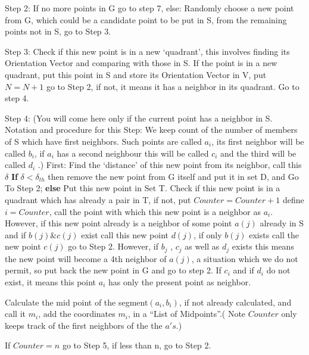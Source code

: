 \documentclass[english]{article}
\begin{document}
Step 2: If no more points in G go to step 7, else: Randomly choose
a new point from G, which could be a candidate point to be put in
S, from the remaining points not in S, go to Step 3.

Step 3: Check if this new point is in a new `quadrant', this involves
finding its Orientation Vector and comparing with those in S. If the
point is in a new quadrant, put this point in S and store its Orientation
Vector in V, put $N=N+1$ go to Step 2, if not, it means it has a
neighbor in its quadrant. Go to step 4.

Step 4: (You will come here only if the current point has a neighbor
in S. Notation and procedure for this Step: We keep count of the number
of members of S which have first neighbors. Such points are called $a_{i}$,
its first neighbor will be called $b_{i}$, if $a_{i}$ has a second
neighbour this will be called $c_{i}$ and the third will be called
$d_{i}$ .) First: Find the `distance' of this new point from its neighbor, call this$\delta$ \textbf{If} $\delta < \delta_{th}$
then remove the new point from G itself and put it in set D, and Go To Step
2; \textbf{else} Put this new point in Set T. Check if this new point is in a quadrant which has already a pair in T, if not, put $Counter=Counter+1$ define $i=Counter$, call the point with which this new point is a neighbor as $a_{i}$. However, if this new point already is a neighbor of some point $a(j)$ already in S and if $b(j) \& c(j)$ exist call this new point $d(j)$, if only $b(j)$ exists call the new point $c(j)$ go to Step 2. However, if  $b_{j}$ , $c_{j}$ as well as $d_{j}$ exists this means the new point will become a 4th neighbor of $a(j)$,  a situation which we do not permit, so put back the new point in G and go to step 2. If $c_{i}$ and if $d_{i}$ do not exist, it means this point $a_{i}$ has only the present point as neighbor. 

  Calculate the mid point of the \textquotedbl{}segment\textquotedbl{}$(a_{i},b_{i})$,
if not already calculated, and call it $m_{i}$, add the coordinates
$m_{i}$, in a {}``List of Midpoints''.( Note $Counter$ only keeps track of the first neighbors of the the $a's$.)

If $Counter=n$ go to Step 5, if less than n, go to Step 2.
\end{document}
